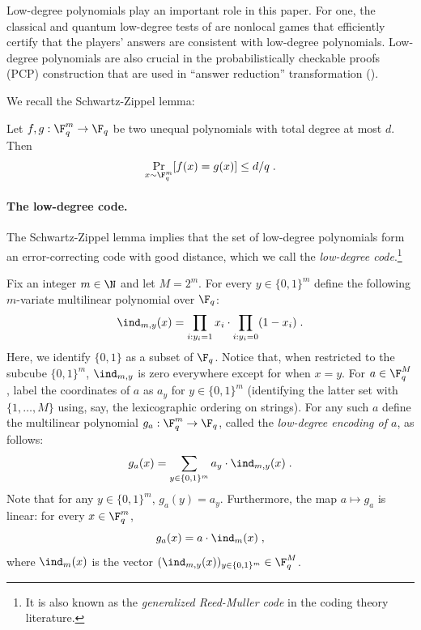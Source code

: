 Low-degree polynomials play an important role in this paper.
For one, the classical and quantum low-degree tests of  are
nonlocal games that efficiently certify that the players' answers are consistent
with low-degree polynomials.
Low-degree polynomials are also crucial in the probabilistically checkable
proofs (PCP) construction that are used in ``answer reduction'' transformation
().

We recall the Schwartz-Zippel lemma: 

\begin{lemma}
  \label{lem:schwartz-zippel}
  Let $f, g: \F_q^m \to \F_q$ be two unequal polynomials with total degree at most $d$. Then
  \begin{equation*}
    \Pr_{x \sim \F_q^m}[f(x) = g(x)] \leq d/q\;.
  \end{equation*}
\end{lemma}


\paragraph{The low-degree code.}
The Schwartz-Zippel lemma implies that the set of low-degree polynomials form an
error-correcting code with good distance, which we call the \emph{low-degree
  code}.\footnote{It is also known as the \emph{generalized Reed-Muller code} in
  the coding theory literature.}

Fix an integer $m \in \N$ and let $M = 2^m$.
For every $y \in \{0,1\}^m$ define the following $m$-variate multilinear
polynomial over $\F_q$:
\[
	\ind_{m,y}(x) = \prod_{i: y_i = 1} x_i \cdot \prod_{i: y_i = 0} (1 - x_i) \;.
\]
Here, we identify $\{0,1\}$ as a subset of $\F_q$.
Notice that, when restricted to the subcube $\{0,1\}^m$, $\ind_{m, y}$ is zero
everywhere except for when $x = y$.
For $a\in \F_q^M$, label the coordinates of $a$ as $a_y$ for $y\in \{0,1\}^m$
(identifying the latter set with $\{1,\ldots,M\}$ using, say, the lexicographic
ordering on strings).
For any such $a$ define the multilinear polynomial $g_a: \F_q^m \to \F_q$,
called the \emph{low-degree encoding of $a$}, as follows:
\begin{equation}
\label{eq:ld-encoding}
	 g_a(x) = \sum_{y \in \{0,1\}^m} a_y \cdot \ind_{m,y}(x)\;.
\end{equation}
Note that for any $y \in \{0,1\}^m$, $g_a(y) = a_y$.
Furthermore, the map $a\mapsto g_a$ is linear: for every $x \in \F_q^m$,
\begin{equation}
\label{eq:low-degree-encoding-definition}
	g_a(x) = a \cdot \ind_m(x)\;,
\end{equation}
where $\ind_m(x)$ is the vector $(\ind_{m,y}(x))_{y \in \{0,1\}^m}\in\F_q^M$.

